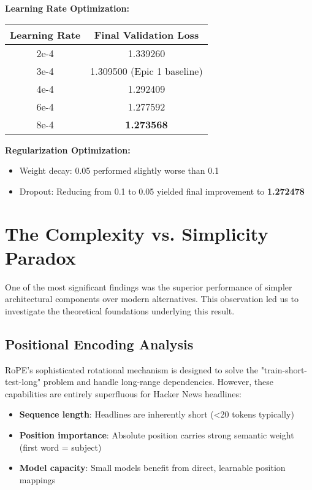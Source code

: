 \documentclass[11pt,a4paper]{article}
\begin{document}
\textbf{Learning Rate Optimization:}
\begin{center}
\begin{tabular}{cc}
\toprule
Learning Rate & Final Validation Loss \\
\midrule
2e-4 & 1.339260 \\
3e-4 & 1.309500 (Epic 1 baseline) \\
4e-4 & 1.292409 \\
6e-4 & 1.277592 \\
8e-4 & \textbf{1.273568} \\
\midrule
\end{tabular}
\end{center}

\textbf{Regularization Optimization:}
\begin{itemize}
    \item Weight decay: 0.05 performed slightly worse than 0.1
    \item Dropout: Reducing from 0.1 to 0.05 yielded final improvement to \textbf{1.272478}
\end{itemize}

\section{The Complexity vs. Simplicity Paradox}

One of the most significant findings was the superior performance of simpler architectural components over modern alternatives. This observation led us to investigate the theoretical foundations underlying this result.

\subsection{Positional Encoding Analysis}
RoPE's sophisticated rotational mechanism is designed to solve the "train-short-test-long" problem and handle long-range dependencies. However, these capabilities are entirely superfluous for Hacker News headlines:

\begin{itemize}
    \item \textbf{Sequence length}: Headlines are inherently short (<20 tokens typically)
    \item \textbf{Position importance}: Absolute position carries strong semantic weight (first word = subject)
    \item \textbf{Model capacity}: Small models benefit from direct, learnable position mappings
\end{itemize}
\end{document}
